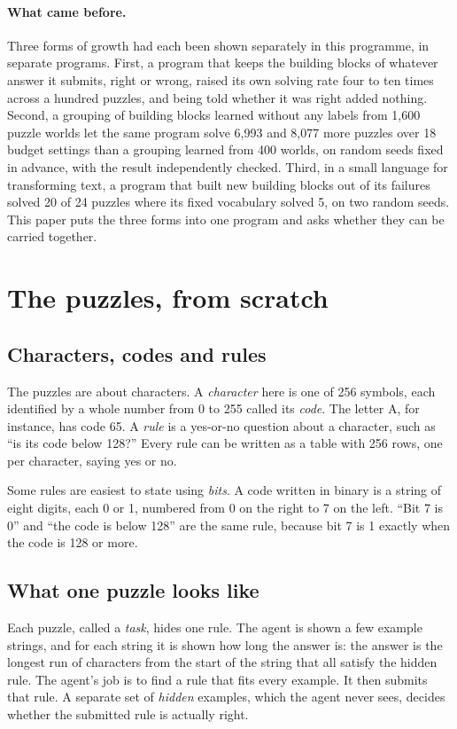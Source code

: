 \documentclass[11pt]{article}
\begin{document}
\paragraph{What came before.} Three forms of growth had each been shown separately in this programme, in separate programs. First, a program that keeps the building blocks of whatever answer it submits, right or wrong, raised its own solving rate four to ten times across a hundred puzzles, and being told whether it was right added nothing. Second, a grouping of building blocks learned without any labels from 1,600 puzzle worlds let the same program solve 6,993 and 8,077 more puzzles over 18 budget settings than a grouping learned from 400 worlds, on random seeds fixed in advance, with the result independently checked. Third, in a small language for transforming text, a program that built new building blocks out of its failures solved 20 of 24 puzzles where its fixed vocabulary solved 5, on two random seeds. This paper puts the three forms into one program and asks whether they can be carried together.

\section{The puzzles, from scratch}
\label{sec:puzzles}

\subsection{Characters, codes and rules}

The puzzles are about characters. A \emph{character} here is one of 256 symbols, each identified by a whole number from 0 to 255 called its \emph{code}. The letter A, for instance, has code 65. A \emph{rule} is a yes-or-no question about a character, such as ``is its code below 128?'' Every rule can be written as a table with 256 rows, one per character, saying yes or no.

Some rules are easiest to state using \emph{bits}. A code written in binary is a string of eight digits, each 0 or 1, numbered from 0 on the right to 7 on the left. ``Bit 7 is 0'' and ``the code is below 128'' are the same rule, because bit 7 is 1 exactly when the code is 128 or more.

\subsection{What one puzzle looks like}

Each puzzle, called a \emph{task}, hides one rule. The agent is shown a few example strings, and for each string it is shown how long the answer is: the answer is the longest run of characters from the start of the string that all satisfy the hidden rule. The agent's job is to find a rule that fits every example. It then submits that rule. A separate set of \emph{hidden} examples, which the agent never sees, decides whether the submitted rule is actually right.
\end{document}
